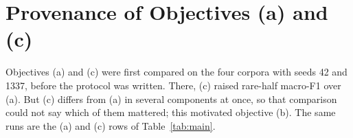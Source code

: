 \documentclass[11pt]{article}
\begin{document}
\begin{table}[h]
\centering
\small
\setlength{\tabcolsep}{4pt}
\caption{GLiNER2 without training on the ten test splits.
\emph{Flagged regions}: precision before and after removing false
positives in flagged regions. \emph{Trained minus zero-shot}: change in
the recall gap between repeated and novel values after training with
(b), pooled and within types ($\geq$20 mentions each); --: no training
split.}
\label{tab:zeroshot}
\end{table}

\FloatBarrier
\section{Provenance of Objectives (a) and (c)}
\label{app:pilot}

Objectives (a) and (c) were first compared on the four corpora with
seeds 42 and 1337, before the protocol was written. There, (c) raised
rare-half macro-F1 over (a). But (c) differs from (a) in several
components at once, so that comparison could not say which of them mattered;
this motivated objective (b). The same runs are the (a) and (c) rows of
Table~\ref{tab:main}.
\end{document}
